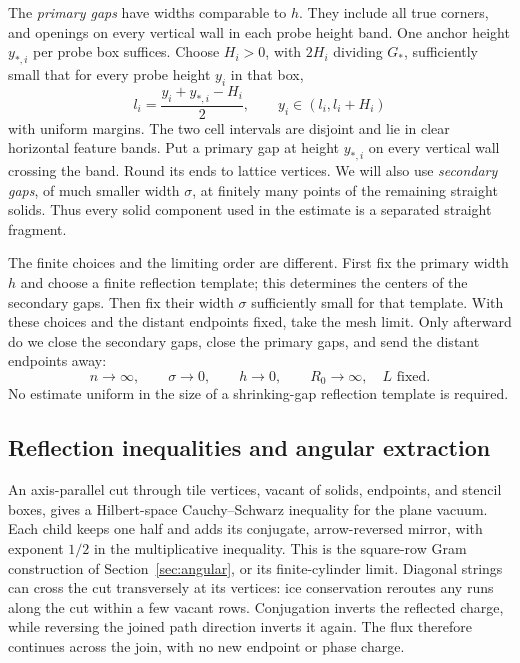 The \emph{primary gaps} have widths comparable to $h$.  They include
all true corners, and openings on every vertical wall in each probe
height band.  One anchor height $y_{*,i}$ per probe box suffices.
Choose $H_i>0$, with $2H_i$ dividing $G_*$, sufficiently small that
for every probe height $y_i$ in that box,
\begin{equation}
 l_i=\frac{y_i+y_{*,i}-H_i}{2},\qquad
 y_i\in(l_i,l_i+H_i)
 \label{hol:marker-cell}
\end{equation}
with uniform margins.  The two cell intervals are disjoint and lie in
clear horizontal feature bands.  Put a primary gap at height $y_{*,i}$
on every vertical wall crossing the band.  Round its ends to lattice
vertices.  We will also use \emph{secondary gaps}, of much smaller
width $\sigma$, at finitely many points of the remaining straight
solids.  Thus every solid component used in the estimate is a separated
straight fragment.

The finite choices and the limiting order are different.  First fix
the primary width $h$ and choose a finite reflection template; this
determines the centers of the secondary gaps.  Then fix their width
$\sigma$ sufficiently small for that template.  With these choices
and the distant endpoints fixed, take the mesh limit.  Only afterward
do we close the secondary gaps, close the primary gaps, and send the
distant endpoints away:
\[
 n\longrightarrow\infty,\qquad
 \sigma\longrightarrow0,\qquad h\longrightarrow0,\qquad
 R_0\longrightarrow\infty,
 \quad L\text{ fixed}.
\]
No estimate uniform in the size of a shrinking-gap reflection
template is required.

\subsection{Reflection inequalities and angular extraction}

An axis-parallel cut through tile vertices, vacant of solids,
endpoints, and stencil boxes, gives a Hilbert-space Cauchy--Schwarz
inequality for the plane vacuum.  Each child keeps one half and adds
its conjugate, arrow-reversed mirror, with exponent $1/2$ in the
multiplicative inequality.  This is the square-row Gram construction
of Section~\ref{sec:angular}, or its finite-cylinder limit.  Diagonal
strings can cross the cut transversely at its vertices: ice
conservation reroutes any runs along the cut within a few vacant rows.
Conjugation inverts the reflected charge, while reversing the joined
path direction inverts it again.  The flux therefore continues across
the join, with no new endpoint or phase charge.

